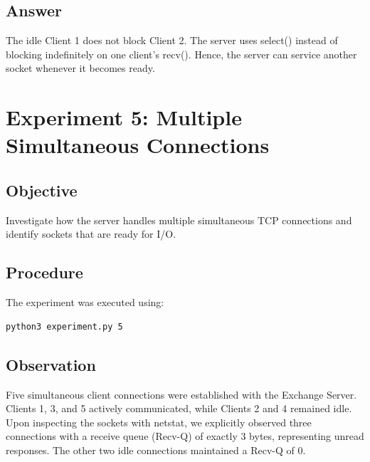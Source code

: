 \documentclass[11pt,a4paper]{article}
\begin{document}
\subsection{Answer}

The idle Client 1 does not block Client 2. The server uses {select()}
instead of blocking indefinitely on one client's {recv()}. Hence, the
server can service another socket whenever it becomes ready.



\section{Experiment 5: Multiple Simultaneous Connections}

\subsection{Objective}

Investigate how the server handles multiple simultaneous TCP connections
and identify sockets that are ready for I/O.

\subsection{Procedure}

The experiment was executed using:

\begin{verbatim}
python3 experiment.py 5
\end{verbatim}


\subsection{Observation}

Five simultaneous client connections were established with the Exchange Server. Clients 1, 3, and 5 actively communicated, while Clients 2 and 4 remained idle. Upon inspecting the sockets with {netstat}, we explicitly observed three connections with a receive queue ({Recv-Q}) of exactly 3 bytes, representing unread responses. The other two idle connections maintained a {Recv-Q} of 0.
\end{document}
